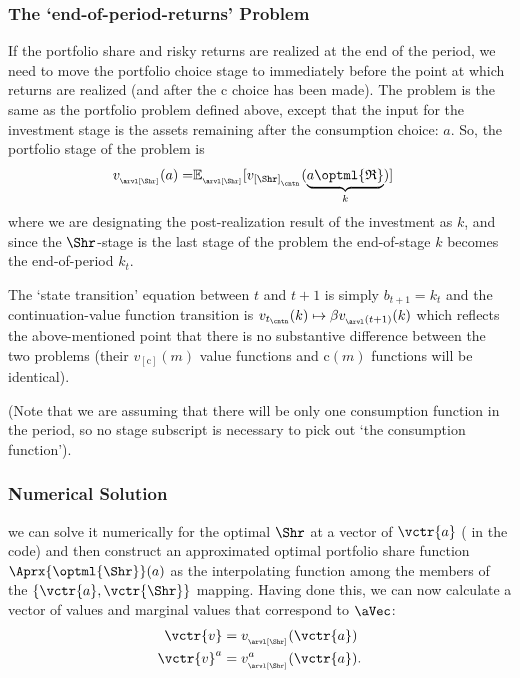 \documentclass[titlepage, headings=optiontotocandhead]{Resources/texmf-local/tex/latex/econtex}
\begin{document}
\subsubsection{The `end-of-period-returns' Problem}

If the portfolio share and risky returns are realized at the end of the {period}, we need to move the portfolio choice {stage} to immediately before the point at which returns are realized (and after the $\mathrm{c}$ choice has been made).  The problem is the same as the portfolio problem defined above, except that the input for the investment {stage} is the assets remaining after the consumption choice: $a$.  So, the portfolio {stage} of the problem is
\begin{equation}\begin{gathered}\begin{aligned}
  v_{_\arvl[\Shr]}(a) = & {\mathbb{E}}_{_\arvl[\Shr]}[v_{[\Shr]_{_\cntn}}(\underbrace{a\optml{\mathfrak{R}}}_{k})] %
    \end{aligned}\end{gathered}\end{equation}
where we are designating the post-realization result of the investment as $k$, and since the $\Shr$-{stage} is the last {stage} of the problem the end-of-{stage} $k$ becomes the end-of-{period} $k_{t}.$ 

The `state transition' equation between $t$ and $t+1$ is simply $b_{t+1} = k_{t}$ and the continuation-value function transition is $v_{t_\cntn}(k) \mapsto \beta v_{_\arvl(t+1)}(k)$ which reflects the above-mentioned point that there is no substantive difference between the two problems (their $v_{[\mathrm{c}]}(m)$ value functions and $\mathrm{c}(m)$ functions will be identical).

(Note that we are assuming that there will be only one consumption function in the period, so no {stage} subscript is necessary to pick out `the consumption function'). 

\subsubsection{Numerical Solution}
we can solve it numerically for the optimal $\Shr$ at a vector of $\vctr{a}$ ({\aVecCode} in the code)  and then construct an approximated optimal portfolio share function $\Aprx{\optml{\Shr}}(a)$ as the interpolating function among the members of the $\{\vctr{a},\vctr{\Shr}\}$ mapping.  Having done this, we can now calculate a vector of values and marginal values that correspond to $\aVec$:
\begin{equation}\begin{gathered}\begin{aligned}
      \vctr{v}  & = v_{_\arvl[\Shr]}(\vctr{a}) \label{eq:vShrEnd}
\\      \vctr{v}^a  & = v^{a}_{_\arvl[\Shr]}(\vctr{a}).
    \end{aligned}\end{gathered}\end{equation}
\end{document}
